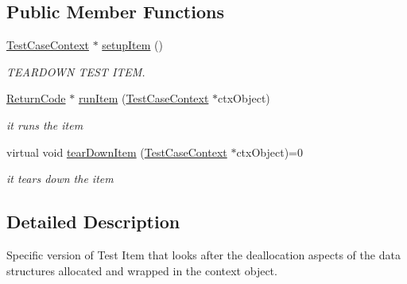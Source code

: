 \subsection*{Public Member Functions}
\begin{DoxyCompactItemize}
\item 
\hyperlink{classit_1_1testbench_1_1data_1_1TestCaseContext}{Test\-Case\-Context} $\ast$ \hyperlink{classit_1_1testbench_1_1data_1_1TearDownTestItem_a9074d5508f1f109b548d732c7bfca1c0}{setup\-Item} ()
\begin{DoxyCompactList}\small\item\em T\-E\-A\-R\-D\-O\-W\-N T\-E\-S\-T I\-T\-E\-M. \end{DoxyCompactList}\item 
\hyperlink{structit_1_1testbench_1_1data_1_1ReturnCode}{Return\-Code} $\ast$ \hyperlink{classit_1_1testbench_1_1data_1_1TearDownTestItem_a68f8adbaa20410493ea1a27fee60c27b}{run\-Item} (\hyperlink{classit_1_1testbench_1_1data_1_1TestCaseContext}{Test\-Case\-Context} $\ast$ctx\-Object)
\begin{DoxyCompactList}\small\item\em it runs the item \end{DoxyCompactList}\item 
virtual void \hyperlink{classit_1_1testbench_1_1data_1_1TearDownTestItem_ad2eb6fafc1b8754ada617a0eccfda082}{tear\-Down\-Item} (\hyperlink{classit_1_1testbench_1_1data_1_1TestCaseContext}{Test\-Case\-Context} $\ast$ctx\-Object)=0
\begin{DoxyCompactList}\small\item\em it tears down the item \end{DoxyCompactList}\end{DoxyCompactItemize}


\subsection{Detailed Description}
Specific version of Test Item that looks after the deallocation aspects of the data structures allocated and wrapped in the context object. 


